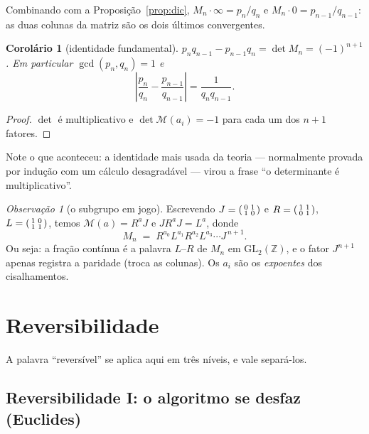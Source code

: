 \documentclass[11pt,a4paper]{article}
\theoremstyle{plain}
\newtheorem{corolario}[teorema]{Corolário}
\theoremstyle{definition}
\theoremstyle{remark}
\newtheorem{obs}[teorema]{Observação}
\newcommand{\Z}{\mathbb{Z}}
\newcommand{\Mat}[1]{\mathcal{M}(#1)}
\newcommand{\GL}{\mathrm{GL}}
\begin{document}
Combinando com a Proposição~\ref{prop:dic}, $M_n\cdot\infty = p_n/q_n$ e
$M_n\cdot 0 = p_{n-1}/q_{n-1}$: as duas colunas da matriz são os dois últimos convergentes.

\begin{corolario}[identidade fundamental]\label{cor:det}
$p_nq_{n-1}-p_{n-1}q_n = \det M_n = (-1)^{n+1}$. Em particular $\gcd(p_n,q_n)=1$ e
\[
  \left| \frac{p_n}{q_n} - \frac{p_{n-1}}{q_{n-1}} \right| = \frac{1}{q_nq_{n-1}} .
\]
\end{corolario}

\begin{proof}
$\det$ é multiplicativo e $\det\Mat{a_i}=-1$ para cada um dos $n+1$ fatores.
\end{proof}

Note o que aconteceu: a identidade mais usada da teoria --- normalmente provada por indução
com um cálculo desagradável --- virou a frase ``o determinante é multiplicativo''.

\begin{obs}[o subgrupo em jogo]
Escrevendo $J = \begin{psmallmatrix}0&1\\1&0\end{psmallmatrix}$ e
$R = \begin{psmallmatrix}1&1\\0&1\end{psmallmatrix}$,
$L = \begin{psmallmatrix}1&0\\1&1\end{psmallmatrix}$, temos $\Mat{a} = R^aJ$ e $JR^aJ = L^a$,
donde
\[
  M_n \;=\; R^{a_0}L^{a_1}R^{a_2}L^{a_3}\cdots J^{\,n+1}.
\]
Ou seja: a fração contínua é a palavra $L$--$R$ de $M_n$ em $\GL_2(\Z)$, e o fator $J^{n+1}$
apenas registra a paridade (troca as colunas). Os $a_i$ são os \emph{expoentes} dos cisalhamentos.
\end{obs}

\section{Reversibilidade}\label{sec:rev}

A palavra ``reversível'' se aplica aqui em três níveis, e vale separá-los.

\subsection{Reversibilidade I: o algoritmo se desfaz (Euclides)}\label{sec:revI}
\end{document}
